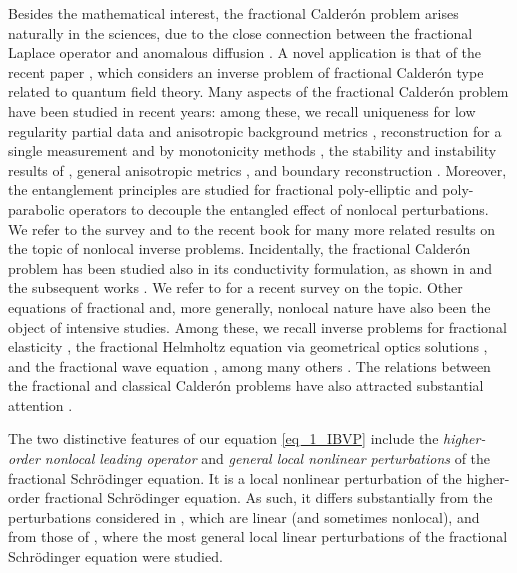 \documentclass [oneside,11pt] {amsart}
\numberwithin{equation}{section}
\begin{document}
Besides the mathematical interest, the fractional Calder\'on problem arises naturally in the sciences, due to the close connection between the fractional Laplace operator and anomalous diffusion \cite{CL24,V09}. A novel application is that of the recent paper \cite{LNOS25}, which considers an inverse problem of fractional Calder\'on type related to quantum field theory. Many aspects of the fractional Calder\'on problem have been studied in recent years: among these, we recall uniqueness for low regularity partial data \cite{RS20a} and anisotropic background metrics \cite{GLX17}, reconstruction for a single measurement \cite{GRSU20} and by monotonicity methods \cite{ HL20, HL19}, the stability and instability results of \cite{ BCR25,RS18, RS20b}, general anisotropic metrics \cite{Fei24, FGKRSU25, FGKU21},
and boundary reconstruction \cite{CR25}. Moreover, the entanglement principles are studied for fractional poly-elliptic \cite{FKU24, FL24} and poly-parabolic operators \cite{LLYan25} to decouple the entangled effect of nonlocal perturbations. We refer to the survey \cite{S17} and to the recent book \cite{LL25book} for many more related results on the topic of nonlocal inverse problems. Incidentally, the fractional Calder\'on problem has been studied also in its conductivity formulation, as shown in \cite{Cov20a} and the subsequent works \cite{Cov20b, Cov22, CMR21, CMRU22, CRZ22}. We refer to \cite{Cov25} for a recent survey on the topic. Other equations of fractional and, more generally, nonlocal nature have also been the object of intensive studies. Among these, we recall inverse problems for fractional elasticity \cite{CdHS22}, the fractional Helmholtz equation via geometrical optics solutions \cite{CdHS25}, and the fractional wave equation \cite{KLW22, LZ25}, among many others \cite{DGM25, Li23, LW25, Lin23}. The relations between the fractional and classical Calder\'on problems have also attracted substantial attention \cite{BCR25, BR25, CGRU23, R23}. 

The two distinctive features of our equation \eqref{eq_1_IBVP}  include the \textit{higher-order nonlocal leading operator} and \textit{general local nonlinear perturbations} of the fractional Schr\"odinger equation. It is a local nonlinear perturbation of the higher-order fractional Schr\"odinger equation. As such, it differs substantially from the perturbations considered in \cite{BGU21, CLR20, Cov21,Li21}, which are linear (and sometimes nonlocal), and from those of \cite{CMRU22}, where the most general local linear perturbations of the fractional Schr\"odinger equation were studied. 
\end{document}
